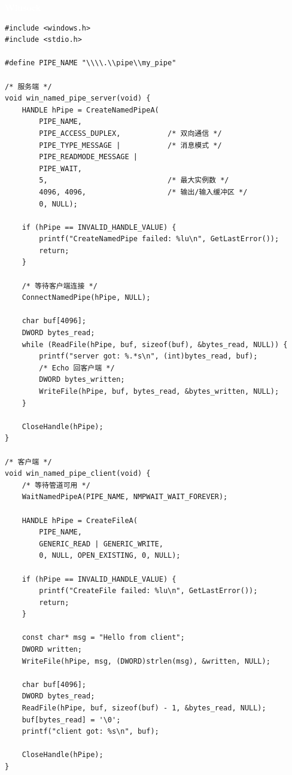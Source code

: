\documentclass[12pt,a4paper,fontset=fandol]{ctexbook}
\newcommand{\winlabel}{%
  \noindent\begin{tcolorbox}[sharp corners,colback=winheadbg,colframe=winheadbg,
    left=6pt,right=6pt,top=2pt,bottom=2pt,boxrule=0pt]
  \textcolor{white}{\small\bfseries\sffamily Winsock}\end{tcolorbox}%
}
\begin{document}
\winlabel
\begin{lstlisting}[style=cstyle]
#include <windows.h>
#include <stdio.h>

#define PIPE_NAME "\\\\.\\pipe\\my_pipe"

/* 服务端 */
void win_named_pipe_server(void) {
    HANDLE hPipe = CreateNamedPipeA(
        PIPE_NAME,
        PIPE_ACCESS_DUPLEX,           /* 双向通信 */
        PIPE_TYPE_MESSAGE |           /* 消息模式 */
        PIPE_READMODE_MESSAGE |
        PIPE_WAIT,
        5,                            /* 最大实例数 */
        4096, 4096,                   /* 输出/输入缓冲区 */
        0, NULL);

    if (hPipe == INVALID_HANDLE_VALUE) {
        printf("CreateNamedPipe failed: %lu\n", GetLastError());
        return;
    }

    /* 等待客户端连接 */
    ConnectNamedPipe(hPipe, NULL);

    char buf[4096];
    DWORD bytes_read;
    while (ReadFile(hPipe, buf, sizeof(buf), &bytes_read, NULL)) {
        printf("server got: %.*s\n", (int)bytes_read, buf);
        /* Echo 回客户端 */
        DWORD bytes_written;
        WriteFile(hPipe, buf, bytes_read, &bytes_written, NULL);
    }

    CloseHandle(hPipe);
}

/* 客户端 */
void win_named_pipe_client(void) {
    /* 等待管道可用 */
    WaitNamedPipeA(PIPE_NAME, NMPWAIT_WAIT_FOREVER);

    HANDLE hPipe = CreateFileA(
        PIPE_NAME,
        GENERIC_READ | GENERIC_WRITE,
        0, NULL, OPEN_EXISTING, 0, NULL);

    if (hPipe == INVALID_HANDLE_VALUE) {
        printf("CreateFile failed: %lu\n", GetLastError());
        return;
    }

    const char* msg = "Hello from client";
    DWORD written;
    WriteFile(hPipe, msg, (DWORD)strlen(msg), &written, NULL);

    char buf[4096];
    DWORD bytes_read;
    ReadFile(hPipe, buf, sizeof(buf) - 1, &bytes_read, NULL);
    buf[bytes_read] = '\0';
    printf("client got: %s\n", buf);

    CloseHandle(hPipe);
}
\end{lstlisting}
\end{document}
